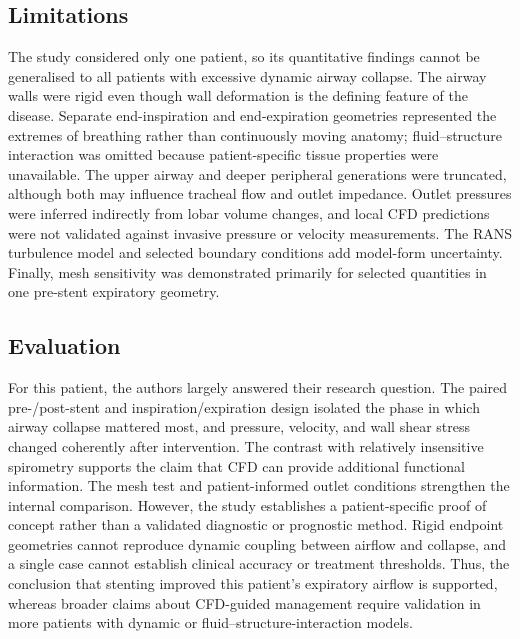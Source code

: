 \documentclass[11pt,a4paper]{article}
\begin{document}
\subsection{Limitations}

The study considered only one patient, so its quantitative findings cannot be
generalised to all patients with excessive dynamic airway collapse. The airway
walls were rigid even though wall deformation is the defining feature of the
disease. Separate end-inspiration and end-expiration geometries represented the
extremes of breathing rather than continuously moving anatomy; fluid--structure
interaction was omitted because patient-specific tissue properties were
unavailable. The upper airway and deeper peripheral generations were truncated,
although both may influence tracheal flow and outlet impedance. Outlet pressures
were inferred indirectly from lobar volume changes, and local CFD predictions
were not validated against invasive pressure or velocity measurements. The RANS
turbulence model and selected boundary conditions add model-form uncertainty.
Finally, mesh sensitivity was demonstrated primarily for selected quantities in
one pre-stent expiratory geometry.

\subsection{Evaluation}

For this patient, the authors largely answered their research question. The
paired pre-/post-stent and inspiration/expiration design isolated the phase in
which airway collapse mattered most, and pressure, velocity, and wall shear
stress changed coherently after intervention. The contrast with relatively
insensitive spirometry supports the claim that CFD can provide additional
functional information. The mesh test and patient-informed outlet conditions
strengthen the internal comparison. However, the study establishes a
patient-specific proof of concept rather than a validated diagnostic or
prognostic method. Rigid endpoint geometries cannot reproduce dynamic coupling
between airflow and collapse, and a single case cannot establish clinical
accuracy or treatment thresholds. Thus, the conclusion that stenting improved
this patient's expiratory airflow is supported, whereas broader claims about
CFD-guided management require validation in more patients with dynamic or
fluid--structure-interaction models.

\end{document}
